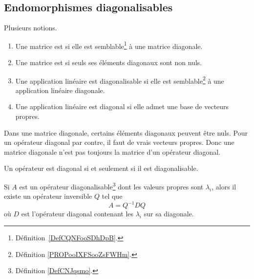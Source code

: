 \subsection{Endomorphismes diagonalisables}

\begin{definition}[Diagonalisable]  \label{DefCNJqsmo}
	Plusieurs notions.
	\begin{enumerate}
		\item
		      Une matrice est  si elle est semblable\footnote{Définition~\ref{DefCQNFooSDhDpB}.} à une matrice diagonale.
		\item
		      Une matrice est  si seuls ses éléments diagonaux sont non nuls.
		\item
		      Une application linéaire est diagonalisable si elle est semblable\footnote{Définition \ref{PROPooIXFSooZsFWHm}.} à une application linéaire diagonale.
		\item
		      Une application linéaire est diagonal si elle admet une base de vecteurs propres.
	\end{enumerate}
	Dans une matrice diagonale, certains éléments diagonaux peuvent être nuls. Pour un opérateur diagonal par contre, il faut de vrais vecteurs propres. Donc une matrice diagonale n'est pas toujours la matrice d'un opérateur diagonal.
\end{definition}

\begin{lemma}	\label{LEMooOCLHooBMwUtm}
	Un opérateur est diagonal si et seulement si il est diagonalisable.
\end{lemma}

\begin{proposition}     \label{PROPooDEETooSOMiGO}
	Si \( A\) est un opérateur diagonalisable\footnote{Définition \ref{DefCNJqsmo}.} dont les valeurs propres sont \( \lambda_i\), alors il existe un opérateur inversible \( Q\) tel que
	\begin{equation}
		A=Q^{-1} DQ
	\end{equation}
	où \( D \) est l'opérateur diagonal contenant les \( \lambda_i\) sur sa diagonale.
\end{proposition}

